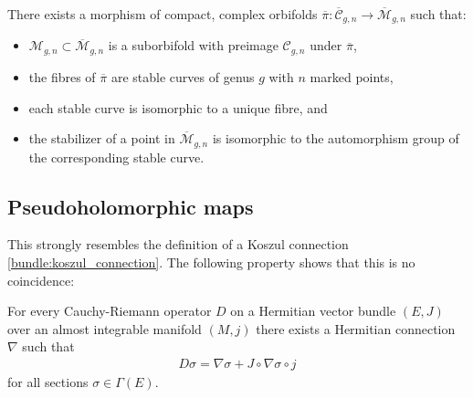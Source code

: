     \begin{property}
        There exists a morphism of compact, complex orbifolds $\overline{\pi}:\overline{\mathcal{C}}_{g,n}\rightarrow\overline{\mathcal{M}}_{g,n}$ such that:
        \begin{itemize}
            \item $\mathcal{M}_{g,n}\subset\overline{\mathcal{M}}_{g,n}$ is a suborbifold with preimage $\mathcal{C}_{g,n}$ under $\overline{\pi}$,
            \item the fibres of $\overline{\pi}$ are stable curves of genus $g$ with $n$ marked points,
            \item each stable curve is isomorphic to a unique fibre, and
            \item the stabilizer of a point in $\overline{\mathcal{M}}_{g,n}$ is isomorphic to the automorphism group of the corresponding stable curve.
        \end{itemize}
    \end{property}

\subsection{Pseudoholomorphic maps}

    This strongly resembles the definition of a Koszul connection \ref{bundle:koszul_connection}. The following property shows that this is no coincidence:
    \begin{property}
        For every Cauchy-Riemann operator $D$ on a Hermitian vector bundle $(E,J)$ over an almost integrable manifold $(M,j)$ there exists a Hermitian connection $\nabla$ such that
        \begin{gather}
            D\sigma = \nabla\sigma + J\circ\nabla\sigma\circ j
        \end{gather}
        for all sections $\sigma\in\Gamma(E)$.
    \end{property}

